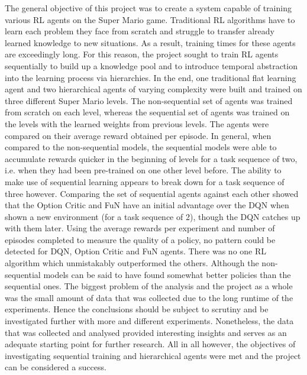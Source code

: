 \documentclass[notitlepage,a4paper,11pt]{article}
\begin{document}
The general objective of this project was to create a system capable of training various RL agents on the Super Mario game. Traditional RL algorithms have to learn each problem they face from scratch and struggle to transfer already learned knowledge to new situations. As a result, training times for these agents are exceedingly long. For this reason, the project sought to train RL agents sequentially to build up a knowledge pool and to introduce temporal abstraction into the learning process via hierarchies. In the end, one traditional flat learning agent and two hierarchical agents of varying complexity were built and trained on three different Super Mario levels. The non-sequential set of agents was trained from scratch on each level, whereas the sequential set of agents was trained on the levels with the learned weights from previous levels. The agents were compared on their average reward obtained per episode. In general, when compared to the non-sequential models, the sequential models were able to accumulate rewards quicker in the beginning of levels for a task sequence of two, i.e. when they had been pre-trained on one other level before. The ability to make use of sequential learning appears to break down for a task sequence of three however. Comparing the set of sequential agents against each other showed that the Option Critic and FuN have an initial advantage over the DQN when shown a new environment (for a task sequence of 2), though the DQN catches up with them later. Using the average rewards per experiment and number of episodes completed to measure the quality of a policy, no pattern could be detected for DQN, Option Critic and FuN agents. There was no one RL algorithm which unmistakably outperformed the others. Although the non-sequential models can be said to have found somewhat better policies than the  sequential ones. The biggest problem of the analysis and the project as a whole was the small amount of data that was collected due to the long runtime of the experiments. Hence the conclusions should be subject to scrutiny and be investigated further with more and different experiments. Nonetheless, the data that was collected and analysed provided interesting insights and serves as an adequate starting point for further research. All in all however, the objectives of investigating sequential training and hierarchical agents were met and the project can be considered a success.

\pagebreak



\end{document}
